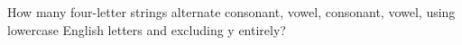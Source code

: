 How many four-letter strings alternate consonant, vowel, consonant, vowel, using lowercase English letters and excluding y entirely?
